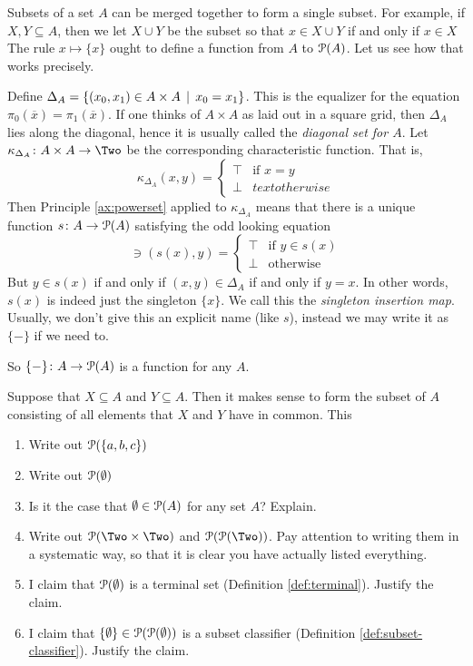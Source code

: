 Subsets of a set $A$ can be merged together to form a single subset. 
For example, if $X,Y\subseteq A$, then we let $X\cup Y$ be the subset
so that $x\in X\cup Y$ if and only if $x\in X$ 
The rule $x\mapsto \{x\}$ ought to define a function from $A$ to ${\mathcal{P}}(A)$. Let us see how that works precisely.

Define $\Delta_A = \{(x_0,x_1)\in A\times A\,\mid\, x_0=x_1\}$. This is the equalizer for the equation $\pi_0(\overline x)=\pi_1(\overline x)$.
If one thinks of $A\times A$ as laid out in a square grid, then $\Delta_A$ lies along the diagonal, hence it is usually called the \emph{diagonal set for $A$}.
Let $\fromto {\kappa_{\Delta_A}}{A\times A}\Two$ be the corresponding characteristic function. That is,
\[
\kappa_{\Delta_A}(x,y) = \begin{cases}
\top & \text{if $x=y$}\\
\bot & text{otherwise}
\end{cases}
\]
Then Principle \ref{ax:powerset} applied to $\kappa_{\Delta_A}$ means that there is a unique function ${s}\colon{A}\to{{\mathcal{P}}(A)}$ satisfying the odd looking equation 
\[
\ni(s(x),y) = \begin{cases}
\top & \text{if $y\in s(x)$}\\
\bot &\text{otherwise}
\end{cases}
\]
But $y\in s(x)$ if and only if $(x,y)\in\Delta_A$ if and only if $y=x$. 
In other words, $s(x)$ is indeed just the singleton $\{x\}$. We call this the \emph{singleton insertion map}. Usually, we don't give this an explicit name (like $s$), instead we may write it as $\{-\}$ if we need to.

So ${\{-\}}\colon{A}\to{{\mathcal{P}}(A)}$ is a function for any $A$. 

Suppose that $X\subseteq A$ and $Y\subseteq A$. Then it makes sense to form the subset of $A$ consisting of all elements that $X$ and $Y$ have in common. This 

\begin{exercises}
	\begin{enumerate}
		\item Write out ${\mathcal{P}}(\{a,b,c\})$
		\item Write out ${\mathcal{P}}(\emptyset)$
		\item Is it the case that $\emptyset \in {\mathcal{P}}(A)$ for any set $A$? Explain. 
		\item Write out $\powerset(\Two\times \Two)$ and $\powerset(\powerset(\Two))$. Pay attention to writing them in a systematic way, so that it is clear you have actually listed everything.
		\item I claim that ${\mathcal{P}}(\emptyset)$ is a terminal set (Definition \ref{def:terminal}). Justify the claim.
		\item I claim that $\{\emptyset\}\in {\mathcal{P}}({\mathcal{P}}(\emptyset))$ is a subset classifier (Definition \ref{def:subset-classifier}). Justify the claim.
	\end{enumerate}
\end{exercises}

